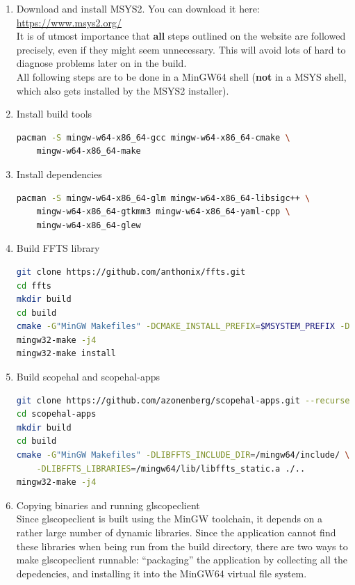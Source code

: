 \begin{enumerate}

\item Download and install MSYS2. You can download it here: \url{https://www.msys2.org/}\\
It is of utmost importance that \textbf{all} steps outlined on the website are followed precisely, even if they might seem unnecessary. This will avoid lots of hard to diagnose problems later on in the build.\\

All following steps are to be done in a MinGW64 shell (\textbf{not} in a MSYS shell, which also gets installed by the MSYS2 installer).

\item Install build tools
\begin{lstlisting}[language=sh]
pacman -S mingw-w64-x86_64-gcc mingw-w64-x86_64-cmake \
    mingw-w64-x86_64-make
\end{lstlisting}

\item Install dependencies
\begin{lstlisting}[language=sh]
pacman -S mingw-w64-x86_64-glm mingw-w64-x86_64-libsigc++ \
    mingw-w64-x86_64-gtkmm3 mingw-w64-x86_64-yaml-cpp \
    mingw-w64-x86_64-glew
\end{lstlisting}

\item Build FFTS library
\begin{lstlisting}[language=sh]
git clone https://github.com/anthonix/ffts.git
cd ffts
mkdir build
cd build
cmake -G"MinGW Makefiles" -DCMAKE_INSTALL_PREFIX=$MSYSTEM_PREFIX -DENABLE_SHARED=ON ..
mingw32-make -j4
mingw32-make install
\end{lstlisting}

\item Build scopehal and scopehal-apps
\begin{lstlisting}[language=sh]
git clone https://github.com/azonenberg/scopehal-apps.git --recurse-submodules
cd scopehal-apps
mkdir build
cd build
cmake -G"MinGW Makefiles" -DLIBFFTS_INCLUDE_DIR=/mingw64/include/ \
    -DLIBFFTS_LIBRARIES=/mingw64/lib/libffts_static.a ./..
mingw32-make -j4
\end{lstlisting}

\item Copying binaries and running glscopeclient \\
Since glscopeclient is built using the MinGW toolchain, it depends on a rather large number of dynamic libraries. Since the application cannot find these libraries when being run from the build directory, there are two ways to make glscopeclient runnable: ``packaging'' the application by collecting all the depedencies, and installing it into the MinGW64 virtual file system.


\end{enumerate}
